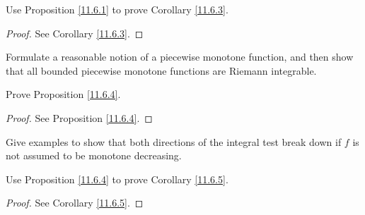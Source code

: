 \exercisesection

\begin{exercise}\label{ex 11.6.1}
    Use Proposition \ref{11.6.1} to prove Corollary \ref{11.6.3}.
\end{exercise}

\begin{proof}
    See Corollary \ref{11.6.3}.
\end{proof}

\begin{exercise}\label{ex 11.6.2}
    Formulate a reasonable notion of a piecewise monotone function, and then show that all bounded piecewise monotone functions are Riemann integrable.
\end{exercise}

\begin{exercise}\label{ex 11.6.3}
    Prove Proposition \ref{11.6.4}.
\end{exercise}

\begin{proof}
    See Proposition \ref{11.6.4}.
\end{proof}

\begin{exercise}\label{ex 11.6.4}
    Give examples to show that both directions of the integral test break down if \(f\) is not assumed to be monotone decreasing.
\end{exercise}

\begin{exercise}\label{ex 11.6.5}
    Use Proposition \ref{11.6.4} to prove Corollary \ref{11.6.5}.
\end{exercise}

\begin{proof}
    See Corollary \ref{11.6.5}.
\end{proof}